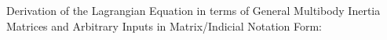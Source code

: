 \documentclass[a4paper]{article}
\begin{document}


\clearpage

\noindent Derivation of the Lagrangian Equation in terms of General Multibody Inertia Matrices and Arbitrary Inputs in Matrix/Indicial Notation Form: 
\end{document}
